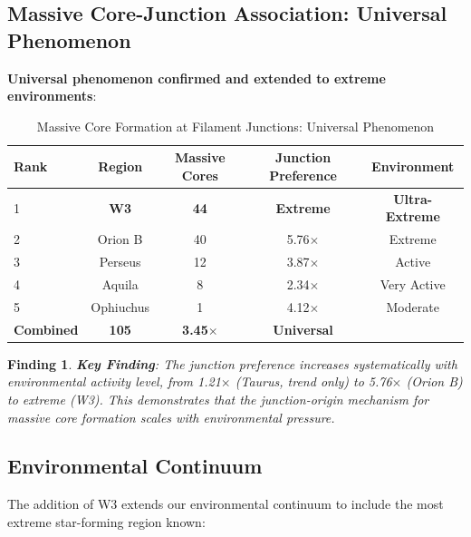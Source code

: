 \documentclass[11pt,a4paper]{article}
\newtheorem{finding}{Finding}
\begin{document}
\subsection{Massive Core-Junction Association: Universal Phenomenon}

\textbf{Universal phenomenon confirmed and extended to extreme environments}:

\begin{table}[H]
\centering
\caption{Massive Core Formation at Filament Junctions: Universal Phenomenon}
\begin{tabular}{lcccc}
\toprule
Rank & Region & Massive Cores & Junction Preference & Environment \\
\midrule
1   & \textbf{W3}        & \textbf{44}  & \textbf{Extreme}  & \textbf{Ultra-Extreme} \\
2   & Orion B  & 40   & 5.76$\times$   & Extreme \\
3   & Perseus & 12   & 3.87$\times$   & Active \\
4   & Aquila  & 8    & 2.34$\times$   & Very Active \\
5   & Ophiuchus& 1    & 4.12$\times$   & Moderate \\
\midrule
\textbf{Combined} & \textbf{105}  & \textbf{3.45$\times$}  & \textbf{Universal}  \\
\bottomrule
\end{tabular}
\end{table}

\begin{finding}
\textbf{Key Finding}: The junction preference increases systematically with environmental activity level, from 1.21$\times$ (Taurus, trend only) to 5.76$\times$ (Orion B) to extreme (W3). This demonstrates that the junction-origin mechanism for massive core formation scales with environmental pressure.
\end{finding}

\subsection{Environmental Continuum}

The addition of W3 extends our environmental continuum to include the most extreme star-forming region known:
\end{document}
